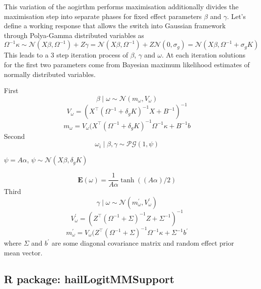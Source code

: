 \documentclass [12pt,a4paper]{report}
\begin{document}
This variation of the aogirthm performs maximisation additionally divides the maximisation step into separate phases for fixed effect parameters $\beta$ and $\gamma$. Let's define a working response that allows the switch into Gaussian framework through Polya-Gamma distributed variables as \[ \Omega^{-1}\kappa \sim \mathcal{N}(X\beta,\Omega^{-1}) +Z\gamma = 
 \mathcal{N}(X\beta,\Omega^{-1}) +Z\mathcal{N}(0,\sigma_g) =  \mathcal{N}(X\beta,\Omega^{-1} +\sigma_g K) \] This leads to a 3 step iteration process of $\beta$, $\gamma$ and $\omega$. At each iteration solutions for the first two parameters come from Bayesian maximum likelihood estimates of normally distributed variables. \par 
 First 
 \[  \beta \mid \omega  \sim \mathcal{N}(m_\omega,V_\omega)  \] 
  \[ V_\omega = (X^{\intercal} (\Omega^{-1}+\delta_g K)^{-1} X + B^{-1})^{-1}  \]  
   \[ m_\omega = V_\omega(X^{\intercal} (\Omega^{-1}+\delta_g K)^{-1}\Omega^{-1} \kappa +  B^{-1}b \] 
Second
    \[  \omega_i \mid \beta,\gamma  \sim \mathcal{PG}(1,\psi)  \]
         \begin{center}
         
      \(  \psi = A\alpha  \),    \(  \psi \sim \mathcal{N}(X\beta,\delta_g K)  \)
  \end{center}  
   \[\mathbf{E}(\omega)=\frac{1}{A\alpha}\tanh((A\alpha)/2)\] 
 Third
  \[   \gamma \mid \omega  \sim \mathcal{N}(m^{\prime}_\omega,V^{\prime}_\omega)  \] 
  \[ V^{\prime}_\omega= (Z^{\intercal} (\Omega^{-1}+\Sigma)^{-1} Z + \Sigma^{-1})^{-1}  \]  
   \[ m^{\prime}_\omega = V_\omega(Z^{\intercal} (\Omega^{-1}+\Sigma)^{-1}\Omega^{-1} \kappa +  \Sigma^{-1}b^{\prime} \]
   where $\Sigma$ and $b^{\prime}$ are some diagonal covariance matrix and random effect prior mean vector.
    

\subsection*{R package: hailLogitMMSupport }
\end{document}
